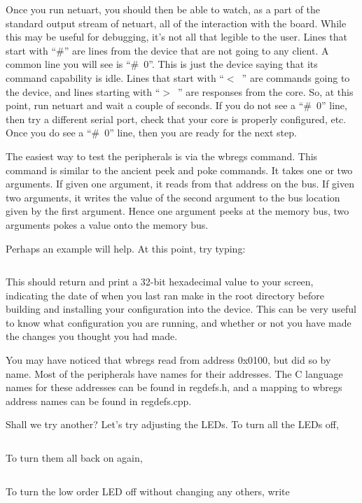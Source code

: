 \documentclass{gqtekspec}
\begin{document}
Once you run netuart, you should then be able to watch, as a part of the
standard output stream of netuart, all of the interaction with the board.
While this may be useful for debugging, it's not all that legible to the
user.   Lines that start with \hbox{``\#''} are lines from the device that are not
going to any client.  A common line you will see is \hbox{``\# 0''}.  This is
just the device saying that its command capability is idle.  Lines that start
with \hbox{``$<$ ''} are commands going to the device, and lines starting with
\hbox{``$>$ ''} are responses from the core.  So, at this point, run netuart and
wait a couple of seconds.  If you do not see a \hbox{``\# 0''} line, then try a
different serial port, check that your core is properly configured, etc.  Once
you do see a \hbox{``\# 0''} line, then you are ready for the next step.

The easiest way to test the peripherals is via the wbregs command.  This
command is similar to the ancient peek and poke commands.  It takes one
or two arguments.  If given one argument, it reads from that address on the
bus.  If given two arguments, it writes the value of the second argument to
the bus location given by the first argument.  Hence one argument peeks
at the memory bus, two arguments pokes a value onto the memory bus.

Perhaps an example will help.  At this point, try typing:

\begin{lstlisting}[language=bash]
% wbregs version
\end{lstlisting}

This should return and print a 32-bit hexadecimal value to your screen,
indicating the date of when you last ran make in the root directory before
building and installing your configuration into the device.  This can be
very useful to know what configuration you are running, and whether or not
you have made the changes you thought you had made.

You may have noticed that wbregs read from address 0x0100, but did so by name.
Most of the peripherals have names for their addresses.  The C language
names for these addresses can be found in regdefs.h, and a mapping to 
wbregs address names can be found in regdefs.cpp.

Shall we try another?  Let's try adjusting the LEDs.  To turn all the LEDs off, 
\begin{lstlisting}[language=bash]
% wbregs leds 0x0f0
\end{lstlisting}
To turn them all back on again,
\begin{lstlisting}[language=bash]
% wbregs leds 0x0ff
\end{lstlisting}
To turn the low order LED off without changing any others, write
\begin{lstlisting}[language=bash]
% wbregs leds 0x010
\end{lstlisting}
\end{document}
